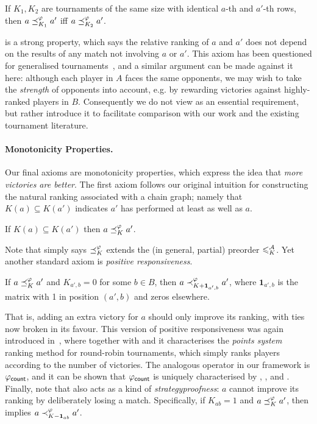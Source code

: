\begin{axiom}[\iim{}]

    If $K_1, K_2$ are tournaments of the same size with identical $a$-th and
    $a'$-th rows, then $a \preceq_{K_1}^\varphi a'$ iff $a \preceq_{K_2}^\varphi a'$.

\end{axiom}

\iim{} is a strong property, which says the relative ranking of $a$ and
$a'$ does not depend on the results of any match not involving $a$ or $a'$.
This axiom has been questioned for generalised
tournaments~\cite{gonzalez2014paired}, and a similar argument can be made
against it here: although each player in $A$ faces the same opponents, we may
wish to take the \emph{strength} of opponents into account, e.g. by rewarding
victories against highly-ranked players in $B$. Consequently we do not view
\iim{} as an essential requirement, but rather introduce it to
facilitate comparison with our work and the existing tournament literature.

\paragraph{Monotonicity Properties.}
%
Our final axioms are monotonicity properties, which express the idea that
\emph{more victories are better}. The first axiom follows our original
intuition for constructing the natural ranking associated with a chain graph;
namely that $K(a) \subseteq K(a')$ indicates $a'$ has performed at least as
well as $a$.

\begin{axiom}[\mon{}]
    If $K(a) \subseteq K(a')$ then $a \preceq_K^\varphi a'$.
\end{axiom}

Note that \mon{} simply says ${\preceq_K^\varphi}$ extends the (in general,
partial) preorder ${\leqslant^{\mathcal{A}}_K}$.
%
Yet another standard axiom is \emph{positive responsiveness}.

\begin{axiom}[\posresp{}]

    If $a \preceq_K^\varphi a'$ and $K_{a',b} = 0$ for some $b \in B$, then $a
    \prec_{K + \bm{1}_{a', b}}^\varphi a'$, where $\bm{1}_{a', b}$ is the matrix
    with 1 in position $(a', b)$ and zeros elsewhere.

\end{axiom}

That is, adding an extra victory for $a$ should only improve its ranking, with
ties now broken in its favour. This version of positive responsiveness was
again introduced in~\cite{rubinstein1980ranking}, where together with
\anon{} and \iim{} it characterises the \emph{points system}
ranking method for round-robin tournaments, which simply ranks players
according to the number of victories. The analogous operator in our framework
is ${\varphi_{\mathsf{count}}}$, and it can be shown that ${\varphi_{\mathsf{count}}}$ is uniquely characterised
by \anon{}, \iim{}, \posresp{} and \dualaxiom{}.
%
Finally, note that \posresp{} also acts as a kind of
\emph{strategyproofness}: $a$ cannot improve its ranking by deliberately losing
a match. Specifically, if $K_{ab} = 1$ and $a \preceq_K^\varphi a'$, then
\posresp{} implies $a \prec_{K - \bm{1}_{ab}}^\varphi a'$.

